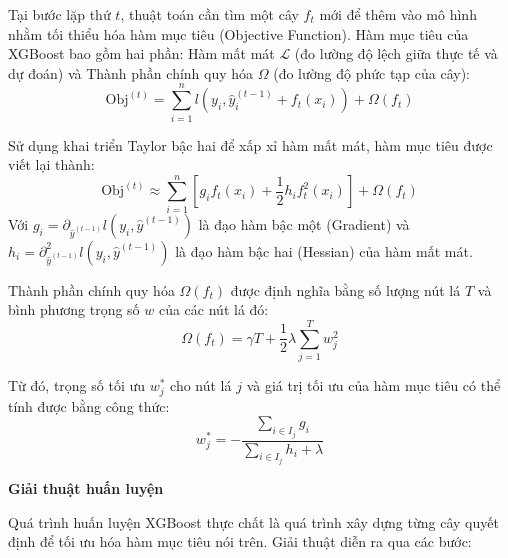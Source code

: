 Tại bước lặp thứ $t$, thuật toán cần tìm một cây $f_t$ mới để thêm vào mô hình nhằm tối thiểu hóa hàm mục tiêu (Objective Function). Hàm mục tiêu của XGBoost bao gồm hai phần: Hàm mất mát $\mathcal{L}$ (đo lường độ lệch giữa thực tế và dự đoán) và Thành phần chính quy hóa $\Omega$ (đo lường độ phức tạp của cây):
\begin{equation}
\text{Obj}^{(t)} = \sum_{i=1}^{n} l\left(y_i, \hat{y}_i^{(t-1)} + f_t(x_i)\right) + \Omega(f_t)
\end{equation}

Sử dụng khai triển Taylor bậc hai để xấp xỉ hàm mất mát, hàm mục tiêu được viết lại thành:
\begin{equation}
\text{Obj}^{(t)} \approx \sum_{i=1}^{n} \left[ g_i f_t(x_i) + \frac{1}{2} h_i f_t^2(x_i) \right] + \Omega(f_t)
\end{equation}
Với $g_i = \partial_{\hat{y}^{(t-1)}} l(y_i, \hat{y}^{(t-1)})$ là đạo hàm bậc một (Gradient) và $h_i = \partial^2_{\hat{y}^{(t-1)}} l(y_i, \hat{y}^{(t-1)})$ là đạo hàm bậc hai (Hessian) của hàm mất mát.

Thành phần chính quy hóa $\Omega(f_t)$ được định nghĩa bằng số lượng nút lá $T$ và bình phương trọng số $w$ của các nút lá đó:
\begin{equation}
\Omega(f_t) = \gamma T + \frac{1}{2} \lambda \sum_{j=1}^{T} w_j^2
\end{equation}

Từ đó, trọng số tối ưu $w_j^*$ cho nút lá $j$ và giá trị tối ưu của hàm mục tiêu có thể tính được bằng công thức:
\begin{equation}
w_j^* = -\frac{\sum_{i \in I_j} g_i}{\sum_{i \in I_j} h_i + \lambda}
\end{equation}

\textbf{\large G}\textbf{iải thuật huấn luyện}

Quá trình huấn luyện XGBoost thực chất là quá trình xây dựng từng cây quyết định để tối ưu hóa hàm mục tiêu nói trên. Giải thuật diễn ra qua các bước:

